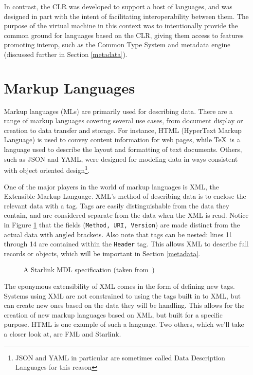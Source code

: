 \documentclass{sig-alternate}
\begin{document}
In contrast, the CLR was developed to support a host of languages, and was designed in part with the intent of facilitating interoperability between them. The purpose of the virtual machine in this context was to intentionally provide the common ground for languages based on the CLR, giving them access to features promoting interop, such as the Common Type System and metadata engine (discussed further in Section \ref{metadata}).


\section{Markup Languages}\label{ML}
Markup languages (MLs) are primarily used for describing data. There are a range of markup languages covering several use cases, from document display or creation to data transfer and storage. For instance, HTML (HyperText Markup Language) is used to convey content information for web pages, while \TeX~is a language used to describe the layout and formatting of text documents.
Others, such as JSON and YAML, were designed for modeling data in ways consistent with object oriented design\footnote{JSON and YAML in particular are sometimes called Data Description Languages for this reason}. 

One of the major players in the world of markup languages is XML, the Extensible Markup Language. XML's method of describing data is to enclose the relevant data with a tag. Tags are easily distinguishable from the data they contain, and are considered separate from the data when the XML is read. Notice in Figure \ref{MDL1} that the fields ({\tt Method, URI, Version}) are made distinct from the actual data with angled brackets.
Also note that tags can be nested: lines 11 through 14 are contained within the {\tt Header} tag. This allows XML to describe full records or objects, which will be important in Section \ref{metadata}.


\begin{figure}
\caption{A Starlink MDL specification (taken from~\cite{Bromberg:2011})}
\label{MDL1}
\end{figure}


The eponymous extensibility of XML comes in the form of defining new tags. Systems using XML are not constrained to using the tags built in to XML, but can create new ones based on the data they will be handling. This allows for the creation of new markup languages based on XML, but built for a specific purpose. HTML is one example of such a language. Two others, which we'll take a closer look at, are FML and Starlink.
\end{document}
